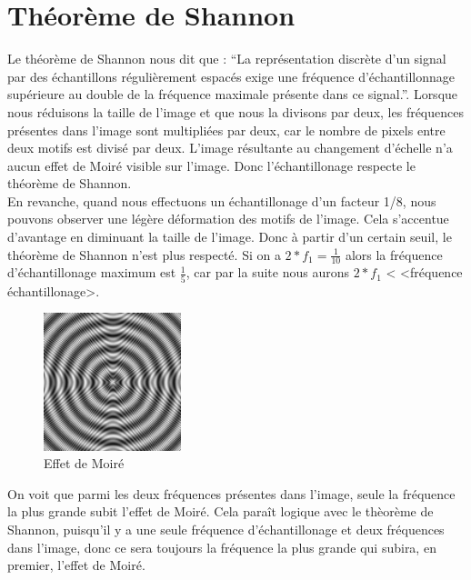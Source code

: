 \documentclass[a4paper,11pt]{article}
\begin{document}
  \section{Théorème de Shannon}
  Le théorème de Shannon nous dit que : \enquote{La représentation discrète d'un signal par des échantillons régulièrement espacés exige une fréquence d'échantillonnage 
  supérieure au double de la fréquence maximale présente dans ce signal.}. Lorsque nous réduisons la taille de l’image et que nous la divisons par deux, les fréquences 
  présentes dans l’image sont multipliées par deux, car le nombre de pixels entre deux motifs est divisé par deux. L’image résultante au changement d’échelle n’a aucun effet 
  de Moiré visible sur l’image. Donc l’échantillonage respecte le théorème de Shannon.\\
  
  En revanche, quand nous effectuons un échantillonage d’un facteur 1/8, nous pouvons observer une légère déformation des motifs de l’image. Cela s’accentue 
  d’avantage en diminuant la taille de l’image. Donc à partir d’un certain seuil, le théorème de Shannon n’est plus respecté. 
  Si on a $2*f_1=\frac{1}{10}$ alors la fréquence d'échantillonage maximum est $\frac{1}{5}$, car par la suite nous aurons $2*f_1$ < <fréquence échantillonage>.\\
  
  \begin{figure}[H]
   \centering
   \includegraphics[width=4cm]{../128_moire.png}
   \caption{Effet de Moiré}
  \end{figure}


  On voit que parmi les deux fréquences présentes dans l’image, seule la fréquence la plus grande subit l’effet de Moiré. Cela paraît logique avec le thèorème de Shannon, 
  puisqu’il y a une seule fréquence d’échantillonage et deux fréquences dans l’image, donc ce sera toujours la fréquence la plus grande qui subira, en premier, l’effet de Moiré.\\
\end{document}
